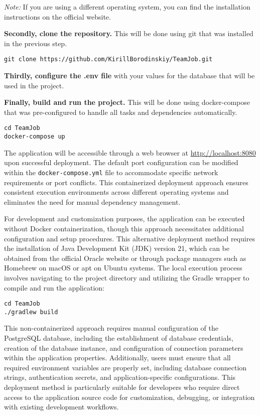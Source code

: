 \textit{Note:} If you are using a different operating system, you can find the installation instructions on the official website.

\textbf{Secondly, clone the repository.} This will be done using git that was installed in the previous step.
\begin{verbatim}
git clone https://github.com/KirillBorodinskiy/TeamJob.git
\end{verbatim}

\textbf{Thirdly, configure the .env file} with your values for the database that will be used in the project.

\textbf{Finally, build and run the project.} This will be done using docker-compose that was pre-configured to handle all tasks and dependencies automatically.
\begin{verbatim}
cd TeamJob
docker-compose up
\end{verbatim}

The application will be accessible through a web browser at \url{http://localhost:8080} upon successful deployment.
The default port configuration can be modified within the \texttt{docker-compose.yml} file to accommodate specific network requirements or port conflicts.
This containerized deployment approach ensures consistent execution environments across different operating systems and eliminates the need for manual dependency management.

For development and customization purposes, the application can be executed without Docker containerization, though this approach necessitates additional configuration and setup procedures.
This alternative deployment method requires the installation of Java Development Kit (JDK) version 21, which can be obtained from the official Oracle website or through package managers such as Homebrew on macOS or apt on Ubuntu systems.
The local execution process involves navigating to the project directory and utilizing the Gradle wrapper to compile and run the application:

\begin{verbatim}
cd TeamJob
./gradlew build
\end{verbatim}

This non-containerized approach requires manual configuration of the PostgreSQL database, including the establishment of database credentials, creation of the database instance, and configuration of connection parameters within the application properties.
Additionally, users must ensure that all required environment variables are properly set, including database connection strings, authentication secrets, and application-specific configurations.
This deployment method is particularly suitable for developers who require direct access to the application source code for customization, debugging, or integration with existing development workflows.

